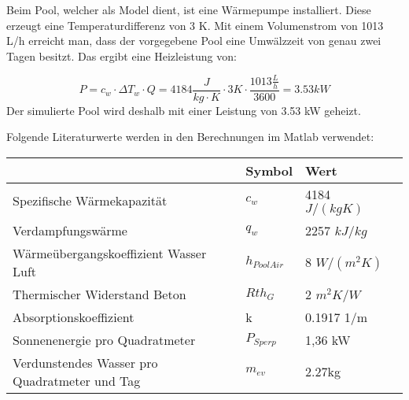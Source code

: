 Beim Pool, welcher als Model dient, ist eine Wärmepumpe installiert. Diese erzeugt eine Temperaturdifferenz von 3 K. Mit einem Volumenstrom von 1013 L/h erreicht man, dass der vorgegebene Pool eine Umwälzzeit von genau zwei Tagen besitzt. Das ergibt eine Heizleistung von:

\begin{equation}
	P = c_w \cdot \Delta T_w \cdot Q = 4184 \frac{J}{kg \cdot K} \cdot 3 K \cdot \frac{1013 \frac{L}{h}}{3600} = 3.53 kW
	\label{eq:Energie Wärmepumpe}
\end{equation}
Der simulierte Pool wird deshalb mit einer Leistung von 3.53 kW geheizt.

Folgende Literaturwerte werden in den Berechnungen im Matlab verwendet:

\begin{table}[h]
	\begin{tabular}{l|l|ll}
														& Symbol		& Wert 					& 		 							\\ \hline
		Spezifische Wärmekapazität						& $c_w$ 		& 4184 $J/(kg K)$ 		& \cite{wiki:Wassereigenschaften} 	\\
		Verdampfungswärme								& $q_w$ 		& 2257 $kJ/kg$ 			& \cite{wiki:Wassereigenschaften} 	\\
		Wärmeübergangskoeffizient Wasser Luft			& $h_{PoolAir}$ & 8 $W/(m^2 K)$			& \cite{Waermeuebergang}			\\
		Thermischer Widerstand Beton 					& $Rth_G$ 		& 2 $m^2K/W$			& \cite{Betonwiderstand}			\\
		Absorptionskoeffizient 							& k				& 0.1917 1/m			& \cite{Waermekoeffizient}			\\
		Sonnenenergie pro Quadratmeter					& $P_{Sperp}$	& 1,36 kW				& \cite{EnergieDerSonne}			\\
		Verdunstendes Wasser pro Quadratmeter und Tag	& $m_{ev}$		& 2.27kg 				& \cite{WasserVerdunsten}
	\end{tabular}
\end{table}